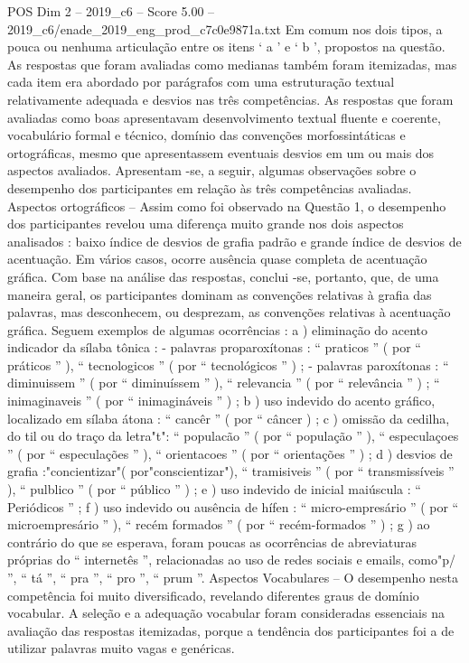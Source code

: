 \begin{textsample}{POS Dim 2 – 2019\_c6 – Score 5.00 – 2019\_c6/enade\_2019\_eng\_prod\_c7c0e9871a.txt}
Em comum nos dois tipos, a pouca ou nenhuma articulação entre os itens ‘ a ’ e ‘ b ’, propostos na questão.
As respostas que foram avaliadas como medianas também foram itemizadas, mas cada item era abordado por parágrafos com uma estruturação textual relativamente adequada e desvios nas três competências.
As respostas que foram avaliadas como boas apresentavam desenvolvimento textual fluente e coerente, vocabulário formal e técnico, domínio das convenções morfossintáticas e ortográficas, mesmo que apresentassem eventuais desvios em um ou mais dos aspectos avaliados.
Apresentam -se, a seguir, algumas observações sobre o desempenho dos participantes em relação às três competências avaliadas.
Aspectos ortográficos – Assim como foi observado na Questão 1, o desempenho dos participantes revelou uma diferença muito grande nos dois aspectos analisados : baixo índice de desvios de grafia padrão e grande índice de desvios de acentuação.
Em vários casos, ocorre ausência quase completa de acentuação gráfica.
Com base na análise das respostas, conclui -se, portanto, que, de uma maneira geral, os participantes dominam as convenções relativas à grafia das palavras, mas desconhecem, ou desprezam, as convenções relativas à acentuação gráfica.
Seguem exemplos de algumas ocorrências : a ) eliminação do acento indicador da sílaba tônica : - palavras proparoxítonas : “ praticos ” ( por “ práticos ” ), “ tecnologicos ” ( por “ tecnológicos ” ) ; - palavras paroxítonas : “ diminuissem ” ( por “ diminuíssem ” ), “ relevancia ” ( por “ relevância ” ) ; “ inimaginaveis ” ( por “ inimagináveis ” ) ; b ) uso indevido do acento gráfico, localizado em sílaba átona : “ cancêr ” ( por “ câncer ) ; c ) omissão da cedilha, do til ou do traço da letra"t": “ populacão ” ( por “ população ” ), “ especulaçoes ” ( por “ especulações ” ), “ orientacoes ” ( por “ orientações ” ) ; d ) desvios de grafia :"concientizar"( por"conscientizar"), “ tramisiveis ” ( por “ transmissíveis ” ), “ pulblico ” ( por “ público ” ) ; e ) uso indevido de inicial maiúscula : “ Periódicos ” ; f ) uso indevido ou ausência de hífen : “ micro-empresário ” ( por “ microempresário ” ), “ recém formados ” ( por “ recém-formados ” ) ; g ) ao contrário do que se esperava, foram poucas as ocorrências de abreviaturas próprias do “ internetês ”, relacionadas ao uso de redes sociais e emails, como"p/ ”, “ tá ”, “ pra ”, “ pro ”, “ prum ”.
Aspectos Vocabulares – O desempenho nesta competência foi muito diversificado, revelando diferentes graus de domínio vocabular.
A seleção e a adequação vocabular foram consideradas essenciais na avaliação das respostas itemizadas, porque a tendência dos participantes foi a de utilizar palavras muito vagas e genéricas.

\end{textsample}
